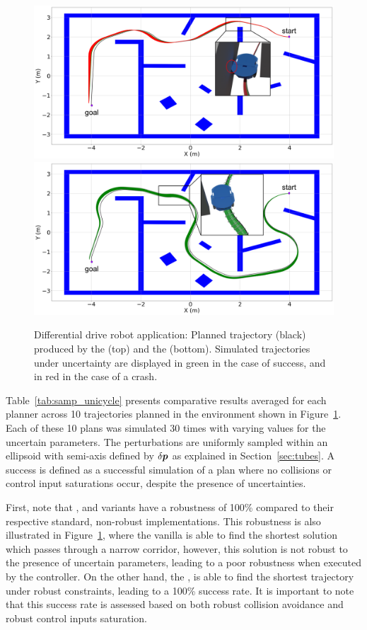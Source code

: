 \begin{figure} [t!]
    \centering
    \includegraphics[width=0.9\linewidth]{figures/samp/non_robust_unic.png}
    \includegraphics[width=0.9\linewidth]{figures/samp/robust_unic.png}
    \caption{Differential drive robot application: Planned trajectory (black) produced by the  (top) and the  (bottom). 
    Simulated trajectories under uncertainty are displayed in green in the case of success, and in red in the case of a crash.}%
    \label{fig:robust_unic}%
\end{figure}

Table~\ref{tab:samp_unicycle} presents comparative results averaged for each planner across 10 trajectories planned in the environment shown in Figure~\ref{fig:robust_unic}. 
Each of these 10 plans was simulated 30 times with varying values for the uncertain parameters.
The perturbations are uniformly sampled within an ellipsoid with semi-axis defined by $\delta \boldsymbol{p}$ as explained in Section~\ref{sec:tubes}.
A success is defined as a successful simulation of a plan where no collisions or control input saturations occur, despite the presence of uncertainties.

First, note that , and  variants have a robustness of 100\% compared to their respective standard, non-robust implementations.
This robustness is also illustrated in Figure~\ref{fig:robust_unic}, where the vanilla  is able to find the shortest solution which passes through a narrow corridor, however, this solution is not robust to the presence of uncertain parameters, leading to a poor robustness when executed by the controller.
On the other hand, the , is able to find the shortest trajectory under robust constraints, leading to a 100\% success rate.
It is important to note that this success rate is assessed based on both robust collision avoidance and robust control inputs saturation.


